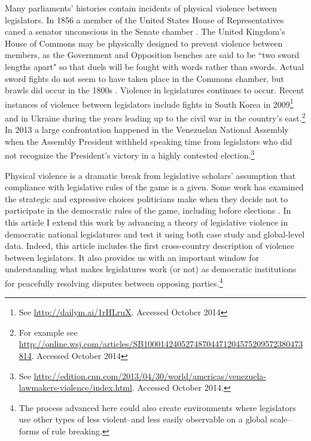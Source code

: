 \documentclass[a4paper]{article}\usepackage[]{graphicx}\usepackage[]{color}
\begin{document}
Many parliaments' histories contain incidents of physical violence between legislators. In 1856 a member of the United States House of Representatives caned a senator unconscious in the Senate chamber \citep{USSenateCanning}. The United Kingdom's House of Commons may be physically designed to prevent violence between members, as the Government and Opposition benches are said to be ``two sword lengths apart" \citep{ParliamentUKSword} so that duels will be fought with words rather than swords. Actual sword fights do not seem to have taken place in the Commons chamber, but brawls did occur in the 1800s \citep[]{ByrneViolence}. Violence in legislatures continues to occur. Recent instances of violence between legislators include fights in South Korea in 2009\footnote{See \url{http://dailym.ai/1rHLruX}. Accessed October 2014} and in Ukraine during the years leading up to the civil war in the country's east.\footnote{For example see \url{http://online.wsj.com/articles/SB10001424052748704471204575209572380473814}. Accessed October 2014} In 2013 a large confrontation happened in the Venezuelan National Assembly when the Assembly President withheld speaking time from legislators who did not recognize the President's victory in a highly contested election.\footnote{See \url{http://edition.cnn.com/2013/04/30/world/americas/venezuela-lawmakers-violence/index.html}. Accessed October 2014.}

Physical violence is a dramatic break from legislative scholars' assumption that compliance with legislative rules of the game is a given. Some work has examined the strategic and expressive choices politicians make when they decide not to participate in the democratic rules of the game, including before elections \citep{wilkinson2006,Beaulieu2008,BeaulieuForthcoming}. In this article I extend this work by advancing a theory of legislative violence in democratic national legislatures and test it using both case study and global-level data. Indeed, this article includes the first cross-country description of violence between legislators. It also provides us with an important window for understanding what makes legislatures work (or not) as democratic institutions for peacefully resolving disputes between opposing parties.\footnote{The process advanced here could also create environments where legislators use other types of less violent--and less easily observable on a global scale--forms of rule breaking.}
\end{document}
